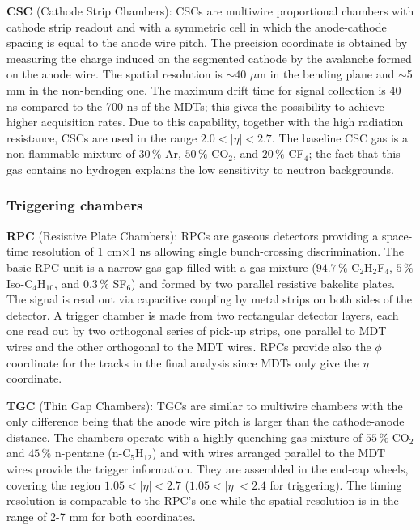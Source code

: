 \ib \textbf{CSC} (Cathode Strip Chambers): CSCs are multiwire proportional chambers  with cathode strip readout and with a symmetric cell in which the anode-cathode spacing is equal to the anode wire pitch. The precision coordinate is obtained by measuring the charge induced on the segmented cathode by the avalanche formed on the anode wire. The spatial resolution is $\sim40$ $\mu$m in the bending plane and $\sim$5 mm in the non-bending one. The maximum drift time for signal collection is 40 ns compared to the 700 ns of the MDTs; this gives the possibility to achieve higher acquisition rates. Due to this capability, together with the high radiation resistance, CSCs are used in the range $2.0< |\eta| <2.7$. The baseline CSC gas is a non-flammable mixture of $30\,\%$ Ar, $50\,\%$ CO$_{2}$, and $20\,\%$ CF$_{4}$; the fact that this gas contains no hydrogen  explains the low sensitivity to neutron backgrounds.
\ei


\subsubsection{Triggering chambers}

\bi

\ib\textbf{RPC} (Resistive Plate Chambers): RPCs are gaseous detectors providing a space-time resolution of 1 cm$\times$1 ns allowing single bunch-crossing discrimination. The basic RPC unit is a narrow gas gap filled with a gas mixture ($94.7\,\%$ C$_{2}$H$_{2}$F$_{4}$, $5\,\%$ Iso-C$_{4}$H$_{10}$, and $0.3\,\%$ SF$_{6}$) and formed by two parallel resistive bakelite plates.  The signal is read out via capacitive coupling by metal strips on both sides of the detector. A trigger chamber is made from two rectangular detector layers, each one read out by two orthogonal series of pick-up strips, one parallel to MDT wires and the other orthogonal to the MDT wires. RPCs provide also the $\phi$ coordinate for the tracks in the final analysis since MDTs only give the $\eta$ coordinate.

\ib\textbf{TGC} (Thin Gap Chambers): TGCs are similar to multiwire chambers with the only difference being that the anode wire pitch is larger than the cathode-anode distance. The chambers operate with a highly-quenching gas mixture of $55\,\%$ CO$_{2}$ and $45\,\%$ n-pentane (n-C$_{5}$H$_{12}$) and with wires  arranged parallel to the MDT wires provide the trigger information. They are assembled in the end-cap wheels, covering the region $1.05<|\eta|<2.7$ ($1.05<|\eta|<2.4$ for triggering). The timing resolution is comparable to the RPC's one while the spatial resolution is in the range of 2-7 mm for both coordinates.

